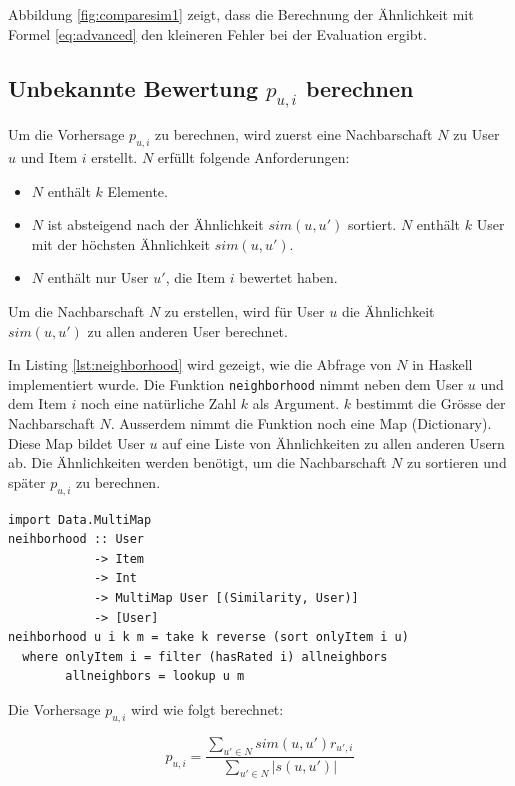 \documentclass[a4paper, 12pt]{article}
\begin{document}
Abbildung \ref{fig:comparesim1} zeigt, dass die Berechnung der Ähnlichkeit mit Formel \ref{eq:advanced} den kleineren Fehler bei der Evaluation ergibt.

\subsection{Unbekannte Bewertung $p_{u,i}$ berechnen}
\label{sec:compp}

Um die Vorhersage $p_{u,i}$ zu berechnen, wird zuerst eine Nachbarschaft $N$ zu User $u$ und Item $i$ erstellt. $N$ erfüllt folgende Anforderungen:

\begin{itemize}
  \item  $N$ enthält $k$ Elemente.
  \item   $N$ ist absteigend nach der Ähnlichkeit $sim(u,u')$ sortiert. $N$ enthält $k$ User mit der höchsten Ähnlichkeit $sim(u,u')$.
  \item  $N$ enthält nur User $u'$, die Item $i$ bewertet haben.
 \end{itemize} 

Um die Nachbarschaft $N$ zu erstellen, wird für User $u$ die Ähnlichkeit $sim(u,u')$ zu allen anderen User berechnet.

In Listing \ref{lst:neighborhood} wird gezeigt, wie die Abfrage von $N$ in Haskell implementiert wurde. Die Funktion \verb|neighborhood| nimmt neben dem User $u$ und dem Item $i$ noch eine natürliche Zahl $k$ als Argument. $k$ bestimmt die Grösse der Nachbarschaft $N$. Ausserdem nimmt die Funktion noch eine Map (Dictionary). Diese Map bildet User $u$ auf eine Liste von Ähnlichkeiten zu allen anderen Usern ab. Die Ähnlichkeiten werden benötigt, um die Nachbarschaft $N$ zu sortieren und später $p_{u,i}$ zu berechnen.

\begin{lstlisting}[caption=Abfrage der Nachbarschaft $N$ in Haskell, label=lst:neighborhood]
import Data.MultiMap
neihborhood :: User
            -> Item
            -> Int
            -> MultiMap User [(Similarity, User)]
            -> [User]
neihborhood u i k m = take k reverse (sort onlyItem i u)
  where onlyItem i = filter (hasRated i) allneighbors
        allneighbors = lookup u m
\end{lstlisting}

Die Vorhersage $p_{u,i}$ wird wie folgt berechnet:

\begin{equation}
  \label{eq:computeprediction}
  p_{u,i} = \frac{\sum_{u' \in N}{sim(u,u') r_{u',i}}}{\sum_{u' \in N}{|s(u,u')|}}
\end{equation}
\end{document}
